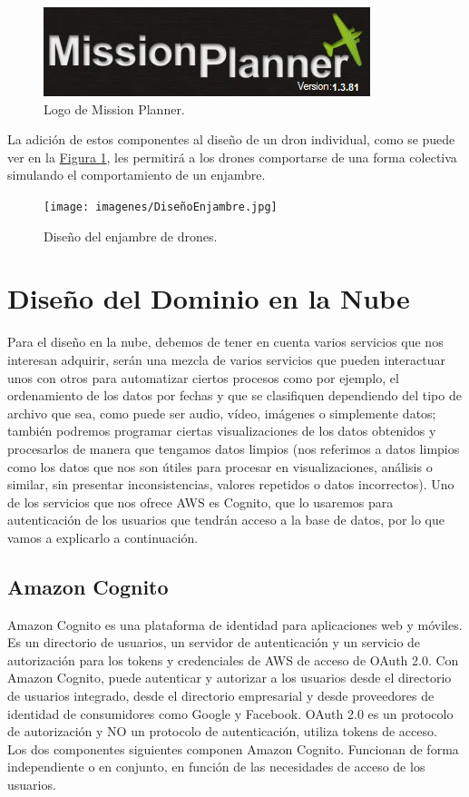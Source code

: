 \begin{figure}[H]
    \centering
    \includegraphics[width=0.5\linewidth]{imagenes/MissionPlanner.png}
    \caption{Logo de Mission Planner.}
\end{figure}
\newpage
\noindent La adición de estos componentes al diseño de un dron individual, como se puede ver en la \hyperref[diseñoenjambre]{Figura \ref{diseñoenjambre}}, les permitirá a los drones comportarse de una forma colectiva simulando el comportamiento de un enjambre.
\newline
\begin{figure}[H]
    \centering
    \texttt{[image: imagenes/DiseñoEnjambre.jpg]}
    \caption{Diseño del enjambre de drones.}
    \label{diseñoenjambre}
\end{figure}

\newpage
\section{Diseño del Dominio en la Nube}
Para el diseño en la nube, debemos de tener en cuenta varios servicios que nos interesan adquirir, serán una mezcla de varios servicios que pueden interactuar unos con otros para automatizar ciertos procesos como por ejemplo, el ordenamiento de los datos por fechas y que se clasifiquen dependiendo del tipo de archivo que sea, como puede ser audio, vídeo, imágenes o simplemente datos; también podremos programar ciertas visualizaciones de los datos obtenidos y procesarlos de manera que tengamos datos limpios (nos referimos a datos limpios como los datos que nos son útiles para procesar en visualizaciones, análisis o similar, sin presentar inconsistencias, valores repetidos o datos incorrectos). 
Uno de los servicios que nos ofrece AWS es Cognito, que lo usaremos para autenticación de los usuarios que tendrán acceso a la base de datos, por lo que vamos a explicarlo a continuación.
\subsection{Amazon Cognito}
Amazon Cognito es una plataforma de identidad para aplicaciones web y móviles. Es un directorio de usuarios, un servidor de autenticación y un servicio de autorización para los tokens y credenciales de AWS de acceso de OAuth 2.0. Con Amazon Cognito, puede autenticar y autorizar a los usuarios desde el directorio de usuarios integrado, desde el directorio empresarial y desde proveedores de identidad de consumidores como Google y Facebook.
OAuth 2.0 es un protocolo de autorización y NO un protocolo de autenticación, utiliza tokens de acceso\cite{128}. \\
Los dos componentes siguientes componen Amazon Cognito. Funcionan de forma independiente o en conjunto, en función de las necesidades de acceso de los usuarios.

